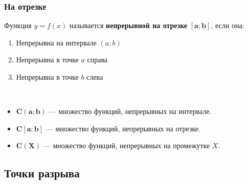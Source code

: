 \subsubsection{На отрезке}

\begin{definition}
  Функция $y = f(x) $ называется \textbf{непрерывной на отрезке} $\bm{[a; b]}$, если она:
  \begin{enumerate}
    \item Непрерывна на интервале $(a; b)$
    \item Непрерывна в точке $a$ справа
    \item Непрерывна в точке $b$ слева
  \end{enumerate}
\end{definition}
\begin{note}\ \\ \vspace{-2\topsep}
\begin{itemize}
  \item $\bm{C(a; b)}$ --- множество функций, непрерывных на интервале. 
  \item $\bm{C[a; b]}$ --- множество функций, непрерывных на отрезке. 
  \item $\bm{C(X)}$ --- множество функций, непрерывных на промежутке $X$. 
\end{itemize}
\end{note}

\subsection{Точки разрыва}

